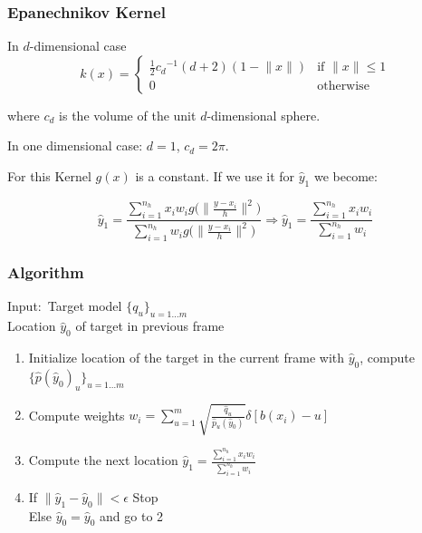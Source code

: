 \documentclass[hyperref={pdfpagelabels=false}]{beamer}
\begin{document}

\begin{frame}
\frametitle{Epanechnikov Kernel}
In $d$-dimensional case
$$ k(x) = \begin{cases} \frac{1}{2}{c_d}^{-1}(d+2)(1-\lVert x \rVert) &\mbox{if } \lVert x \rVert \le 1 \\ 
 0 & \mbox{otherwise } \end{cases} $$

where $c_d$ is the volume of the unit $d$-dimensional sphere.

In one dimensional case: $d=1$, $c_d = 2\pi$.

\vspace{10pt}
For this Kernel $g(x)$ is a constant. If we use it for $\hat{y}_1$ we become:

$$\hat{y}_1 = \frac{\sum_{i=1}^{n_h}x_iw_ig\Big(\Big\lVert\frac{ y-x_i}{h}\Big\rVert^2\Big)}{\sum_{i=1}^{n_h}w_ig\Big(\Big\lVert\frac{ y-x_i}{h}\Big\rVert^2\Big)} \Rightarrow
\hat{y}_1 = \frac{\sum_{i=1}^{n_h}x_iw_i}{\sum_{i=1}^{n_h}w_i}$$

\end{frame}


\begin{frame}
\frametitle{Algorithm}
{\color{darkred}Input}:\ Target model $\{q_u\}_{u=1\dots m}$\\
	\hspace{30pt} Location $\hat{y}_0$ of target in previous frame
\begin{enumerate}
\item Initialize location of the target in the current frame with $\hat{y}_0$, compute $\{\hat{p}(\hat{y}_0)_u\}_{u=1\dots m}$
\item Compute weights $w_i = \sum_{u=1}^{m}\sqrt{\frac{\hat{q}_u}{\hat{p}_u(\hat{y}_0)}}\delta[b(x_i)-u]$
\item Compute the next location $\hat{y}_1 = \frac{\sum_{i=1}^{n_h}x_iw_i}{\sum_{i=1}^{n_h}w_i}$
\item If $\lVert\hat{y}_1-\hat{y}_0\rVert < \epsilon$ Stop\\
Else $\hat{y}_0=\hat{y}_0$ and go to 2
\end{enumerate}

\end{frame}

\end{document}
